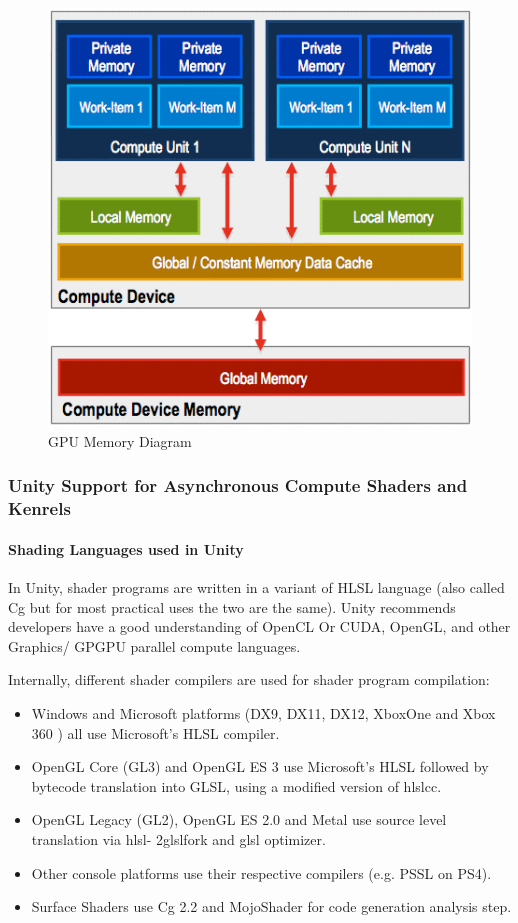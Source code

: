 \documentclass[a4paper,10pt]{article}
\begin{document}
	\begin{figure}[H]
	\centerline{\includegraphics[scale=0.5]{gpuMem.png}}
	\caption{GPU Memory Diagram}
	\label{fig:gpuMem}
	\end{figure}
\pagebreak



\subsubsection{Unity Support for Asynchronous Compute Shaders and Kenrels}
\paragraph{Shading Languages used in Unity} 
In Unity, shader programs are written in a variant of HLSL language (also called Cg but for most practical uses the two are the same). Unity recommends developers have a good understanding 
of OpenCL Or CUDA, OpenGL, and other Graphics/ GPGPU parallel compute languages.  

Internally, different shader compilers are used for shader program compilation:\cite{unityShaders}
\begin{itemize}
  \item Windows and Microsoft platforms (DX9, DX11, DX12, XboxOne and Xbox 360 ) all use Microsoft's HLSL compiler.
  \item OpenGL Core (GL3) and OpenGL ES 3 use Microsoft’s HLSL followed by bytecode translation into GLSL, using a modified version of hlslcc.
  \item OpenGL Legacy (GL2), OpenGL ES 2.0 and Metal use source level 
  translation via
  hlsl- 2glslfork and glsl optimizer. 
  \item Other console platforms use their respective compilers (e.g. PSSL on PS4).
  \item Surface Shaders use Cg 2.2 and MojoShader for code generation analysis step.
\end{itemize} %
\end{document}
